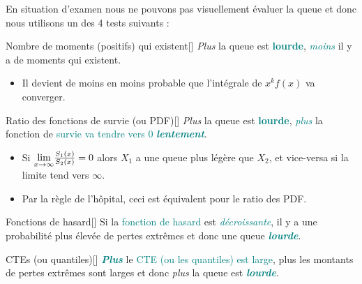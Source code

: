 \documentclass[10pt, french]{article}
\begin{document}
\begin{multicols*}{2}
En situation d'examen nous ne pouvons pas visuellement évaluer la queue et donc nous utilisons un des 4 tests suivants :
\begin{definitionGENERAL}{Nombre de moments (positifs) qui existent}[]
\textit{Plus} la queue est \textbf{\textbf{\textcolor{teal}{lourde}}}, \textit{\textcolor{teal}{moins}} il y a de moments qui existent.\\

\begin{itemize}
	\item	Il devient de moins en moins probable que l'intégrale de $x^{k}f(x)$ va converger.
\end{itemize}
\end{definitionGENERAL}

\begin{definitionGENERAL}{Ratio des fonctions de survie (ou PDF)}[]
\textit{Plus} la queue est \textbf{\textbf{\textcolor{teal}{lourde}}}, \textit{\textcolor{teal}{plus}} la fonction de \textcolor{teal}{survie va tendre vers 0 \textit{\textbf{lentement}}}.\\

\begin{itemize}
	\item	Si $\underset{x \rightarrow \infty}{\lim} \frac{S_{1}(x)}{S_{2}(x)}	=	0$ alors $X_{1}$ a une queue plus légère que $X_{2}$, et vice-versa si la limite tend vers $\infty$.
	\item	Par la règle de l'hôpital, ceci est équivalent pour le ratio des PDF.
\end{itemize}
\end{definitionGENERAL}

\begin{definitionGENERAL}{Fonctions de hasard}[]
Si la \textcolor{teal}{fonction de hasard} est \textit{\textcolor{teal}{décroissante}}, il y a une probabilité plus élevée de pertes extrêmes et donc une queue \textit{\textbf{\textcolor{teal}{lourde}}}.
\end{definitionGENERAL}

\begin{definitionGENERAL}{CTEs (ou quantiles)}[]
\textbf{\textit{\textcolor{teal}{Plus}}} le \textcolor{teal}{CTE (ou les quantiles) est large}, plus les montants de pertes extrêmes sont larges et donc \textit{plus} la queue est \textit{\textbf{\textcolor{teal}{lourde}}}.
\end{definitionGENERAL}




\end{multicols*}
\end{document}
